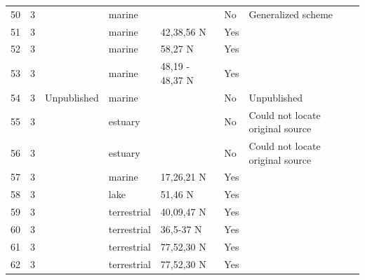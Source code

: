 \documentclass[12pt]{article}
\begin{document}
\begin{landscape}
\begin{table}[h!]
{\begin{tabular}{p{2.8cm}p{1.3cm}p{5.5cm}p{2.2cm}p{2.5cm}lp{3.5cm}}
        50    & 3 & \citet{Nybakken1982}    & marine &       & No    & Generalized scheme \\
        51    & 3 & \citet{Dexter1947}    & marine & 42,38,56 N & Yes   &       \\
        52    & 3 & \citet{Paine1980a}    & marine & 58,27 N & Yes   &       \\
        53    & 3 & \citet{Paine1980a}    & marine & 48,19 - 48,37 N & Yes   &       \\
        54    & 3 & Unpublished  & marine &       & No    & Unpublished \\
        55    & 3 & \citet{Milne1972}  & estuary &       & No    & Could not locate original source \\
        56    & 3 & \citet{Milne1972}  & estuary &       & No    & Could not locate original source \\
        57    & 3 & \citet{Yanez1978}  & marine & 17,26,21 N & Yes   &       \\
        58    & 3 & \citet{Cohen1990}  & lake & 51,46 N & Yes   &       \\
        59    & 3 & \citet{Twomey1945}    & terrestrial & 40,09,47 N & Yes   &       \\
        60    & 3 & \citet{Rasmussen1941}    & terrestrial & 36,5-37 N & Yes   &       \\
        61    & 3 & \citet{Summerhayes1928}  & terrestrial & 77,52,30 N & Yes   &       \\
        62    & 3 & \citet{Summerhayes1928}  & terrestrial & 77,52,30 N & Yes   &       \\
        \hline
      \end{tabular}}%
      \end{table}

        \newpage


\end{landscape}
\end{document}
